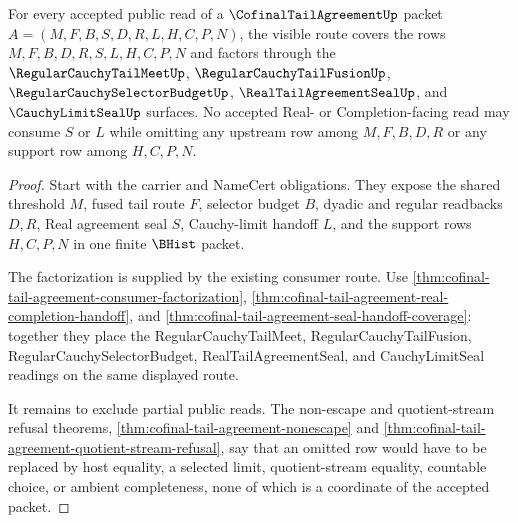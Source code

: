 \begin{theorem}
\label{thm:cofinal-tail-agreement-route-coverage}
For every accepted public read of a $\CofinalTailAgreementUp$ packet $A=(M,F,B,S,D,R,L,H,C,P,N)$, the visible route covers the rows $M,F,B,D,R,S,L,H,C,P,N$ and factors through the $\RegularCauchyTailMeetUp$, $\RegularCauchyTailFusionUp$, $\RegularCauchySelectorBudgetUp$, $\RealTailAgreementSealUp$, and $\CauchyLimitSealUp$ surfaces. No accepted Real- or Completion-facing read may consume $S$ or $L$ while omitting any upstream row among $M,F,B,D,R$ or any support row among $H,C,P,N$.
\end{theorem}
\begin{proof}
Start with the carrier and NameCert obligations. They expose the shared threshold $M$, fused tail route $F$, selector budget $B$, dyadic and regular readbacks $D,R$, Real agreement seal $S$, Cauchy-limit handoff $L$, and the support rows $H,C,P,N$ in one finite $\BHist$ packet.

The factorization is supplied by the existing consumer route. Use \autoref{thm:cofinal-tail-agreement-consumer-factorization}, \autoref{thm:cofinal-tail-agreement-real-completion-handoff}, and \autoref{thm:cofinal-tail-agreement-seal-handoff-coverage}: together they place the RegularCauchyTailMeet, RegularCauchyTailFusion, RegularCauchySelectorBudget, RealTailAgreementSeal, and CauchyLimitSeal readings on the same displayed route.

It remains to exclude partial public reads. The non-escape and quotient-stream refusal theorems, \autoref{thm:cofinal-tail-agreement-nonescape} and \autoref{thm:cofinal-tail-agreement-quotient-stream-refusal}, say that an omitted row would have to be replaced by host equality, a selected limit, quotient-stream equality, countable choice, or ambient completeness, none of which is a coordinate of the accepted packet.
\end{proof}

